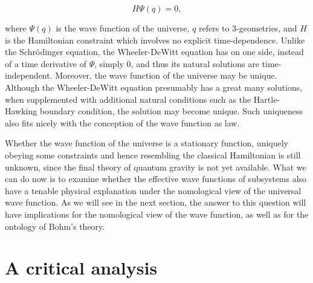 \begin{equation}
H\Psi(q)=0,
\label{WD}
\end{equation}

\noindent where $\Psi(q)$ is the wave function of the universe, $q$ refers to 3-geometries, and $H$ is the Hamiltonian constraint which involves no explicit time-dependence. Unlike the Schr\"{o}dinger equation, the Wheeler-DeWitt equation has on one side, instead of a time derivative of $\Psi$, simply 0, and thus its natural solutions are time-independent. 
Moreover, the wave function of the universe may be unique. Although the Wheeler-DeWitt equation presumably has a great many solutions, when supplemented with additional natural conditions such as the Hartle-Hawking boundary condition, the solution may become unique. Such uniqueness also fits nicely
with the conception of the wave function as law.

Whether the wave function of the universe is a stationary function, uniquely obeying some constraints and hence resembling the classical Hamiltonian is still unknown, since the final theory of quantum gravity is not yet available.
What we can do now is to examine whether the effective wave functions of subsystems also have a tenable physical explanation under the nomological view of the universal wave function.  As we will see in the next section, the answer to this question will have implications for the  nomological view of the wave function, as well as for the ontology of Bohm's theory.

\section{A critical analysis}

